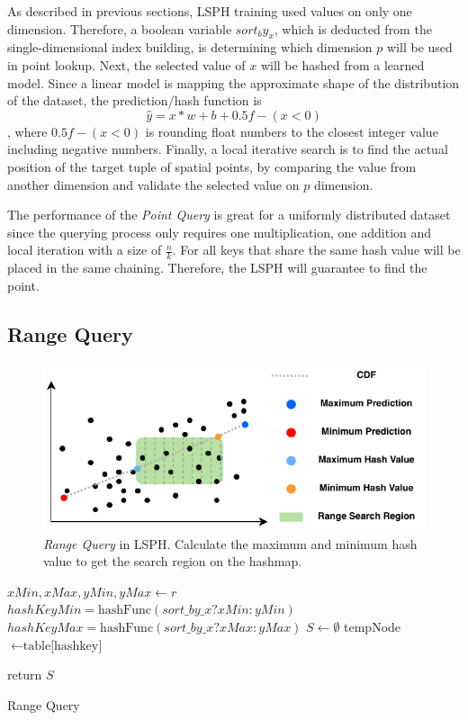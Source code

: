 As described in previous sections, LSPH training used values on only one dimension. Therefore, a boolean variable $sort_by_x$, which is deducted from the single-dimensional index building,  is determining which dimension $p$ will be used in point lookup. Next, the selected value of $x$ will be hashed from a learned model. Since a linear model is mapping the approximate shape of the distribution of the dataset, the prediction/hash function is 
\begin{equation}
\hat{y} = x * w + b + 0.5f - (x<0)
\end{equation}
, where $0.5f - (x<0)$ is rounding float numbers to the closest integer value including negative numbers. Finally, a local iterative search is to find the actual position of the target tuple of spatial points, by comparing the value from another dimension and validate the selected value on $p$ dimension. 

The performance of the \textit{Point Query} is great for a uniformly distributed dataset since the querying process only requires one multiplication, one addition and local iteration with a size of  $\frac{n}{k}$. For all keys that share the same hash value will be placed in the same chaining. Therefore, the LSPH will guarantee to find the point. 


\subsection{Range Query}

\begin{figure}[ht]
\centering
\includegraphics[scale=1]{Figures/range_search.pdf}
\caption{\textit{Range Query} in LSPH. Calculate the maximum and minimum hash value to get the search region on the hashmap.}
\label{fig:range_search}
\end{figure}


\begin{algorithm}[H] \label{range_query}
\SetAlgoLined
{}
 $xMin, xMax, yMin, yMax\leftarrow{r}$\;
 $hashKeyMin = \text{hashFunc}(sort\_by\_x ? xMin : yMin)$\;
 $hashKeyMax = \text{hashFunc}(sort\_by\_x ? xMax : yMax)$\;
 $S\leftarrow{\emptyset}$\;
 {
 tempNode $\leftarrow{\text{table[hashkey]}}$\;
 }
 
 return $S$\;
 \caption{Range Query}
\end{algorithm}


